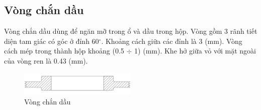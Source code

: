         \subsection{Vòng chắn dầu}
            \hspace*{0.6cm}Vòng chắn dầu dùng để ngăn mỡ trong ổ và dầu trong hộp. Vòng gồm 3 rãnh tiết diện tam giác có góc ở đỉnh 60$^\circ$. Khoảng cách giữa các đỉnh là 3 (mm). Vòng cách mép trong thành hộp khoảng (0.5 $\div$ 1) (mm). Khe hở giữa vỏ với mặt ngoài của vòng ren là 0.43 (mm).
            \begin{figure}[H]
                \centering
                \includegraphics[width=0.5\textwidth]{pictures/oil_shield.png}
                \caption{Vòng chắn dầu}
                \label{oil_shield}
            \end{figure}
           
            